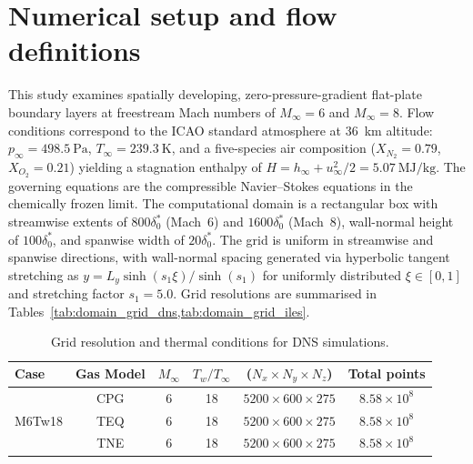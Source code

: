 \section{Numerical setup and flow definitions}

This study examines spatially developing, zero-pressure-gradient flat-plate boundary layers at freestream Mach numbers of $M_\infty=6$ and $M_\infty=8$. Flow conditions correspond to the ICAO standard atmosphere at 36~km altitude: $p_\infty=498.5~\text{Pa}$, $T_\infty=239.3~\text{K}$, and a five-species air composition ($X_{N_2}=0.79$, $X_{O_2}=0.21$) yielding a stagnation enthalpy of $H=h_\infty+u_\infty^2/2=5.07~\text{MJ/kg}$. The governing equations are the compressible Navier--Stokes equations in the chemically frozen limit. The computational domain is a rectangular box with streamwise extents of $800\delta^*_0$ (Mach~6) and $1600\delta^*_0$ (Mach~8), wall-normal height of $100\delta^*_0$, and spanwise width of $20\delta^*_0$. The grid is uniform in streamwise and spanwise directions, with wall-normal spacing generated via hyperbolic tangent stretching as $y = L_y \sinh(s_1 \xi)/\sinh(s_1)$ for uniformly distributed $\xi \in [0,1]$ and stretching factor $s_1 = 5.0$. Grid resolutions are summarised in Tables~\ref{tab:domain_grid_dns,tab:domain_grid_iles}.



\begin{table}[hbt!]
\centering
\caption{Grid resolution and thermal conditions for DNS simulations.}
\begin{tabular}{lccccc}
\toprule
Case & Gas Model & $M_\infty$ & $T_w/T_\infty$ &  ($N_x \times N_y \times N_z$) & Total points \\
\midrule
\multirow{3}{*}{M6Tw18} & CPG & 6 & 18 & $5200 \times 600 \times 275$ & $8.58\times 10^8$ \\
 & TEQ & 6 & 18 & $5200 \times 600 \times 275$ & $8.58\times 10^8$ \\
 & TNE & 6 & 18 & $5200 \times 600 \times 275$ & $8.58\times 10^8$ \\
\bottomrule
\end{tabular}
\label{tab:domain_grid_dns}
\end{table}

